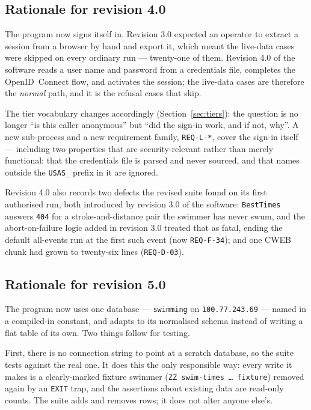 \documentclass[12pt]{article}
\newcommand{\code}[1]{\texttt{#1}}
\newcommand{\req}[1]{\texttt{#1}}
\begin{document}
\subsection{Rationale for revision 4.0}

The program now signs itself in.  Revision 3.0 expected an operator to
extract a session from a browser by hand and export it, which meant the
live-data cases were skipped on every ordinary run --- twenty-one of
them.  Revision 4.0 of the software reads a user name and password from
a credentials file, completes the OpenID~Connect flow, and activates
the session; the live-data cases are therefore the \emph{normal} path,
and it is the refusal cases that skip.

The tier vocabulary changes accordingly (Section~\ref{sec:tiers}): the
question is no longer ``is this caller anonymous'' but ``did the
sign-in work, and if not, why''.  A new sub-process and a new
requirement family, \req{REQ-L-*}, cover the sign-in itself ---
including two properties that are security-relevant rather than merely
functional: that the credentials file is parsed and never sourced, and
that names outside the \code{USAS\_} prefix in it are ignored.

Revision 4.0 also records two defects the revised suite found on its
first authorised run, both introduced by revision 3.0 of the software:
\code{BestTimes} answers \code{404} for a stroke-and-distance pair the
swimmer has never swum, and the abort-on-failure logic added in
revision 3.0 treated that as fatal, ending the default all-events run
at the first such event (now \req{REQ-F-34}); and one CWEB chunk had
grown to twenty-six lines (\req{REQ-D-03}).

\subsection{Rationale for revision 5.0}

The program now uses one database --- \code{swimming} on
\code{100.77.243.69} --- named in a compiled-in constant, and adapts to
its normalised schema instead of writing a flat table of its own.  Two
things follow for testing.

First, there is no connection string to point at a scratch database, so
the suite tests against the real one.  It does this the only responsible
way: every write it makes is a clearly-marked fixture swimmer
(\code{ZZ swim-times \dots{} fixture}) removed again by an \code{EXIT}
trap, and the assertions about existing data are read-only counts.  The
suite adds and removes rows; it does not alter anyone else's.
\end{document}
